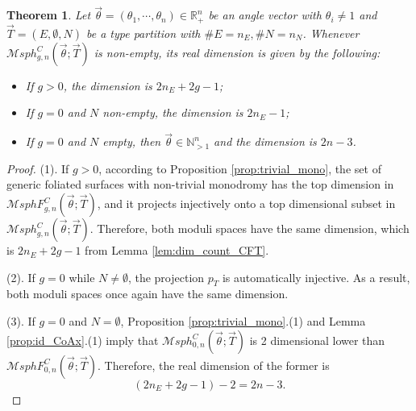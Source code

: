 \documentclass[pdflatex,sn-mathphys]{sn-jnl}%
\numberwithin{equation}{section}
\theoremstyle{thmstyleone}%
\newtheorem{theorem}{Theorem}[section]%
\newcommand{\RR}{\mathbb{R}}
\newcommand{\NN}{\mathbb{N}}%
\newcommand{\MsphCT}[4]{\mathcal{M}sph_{#1,#2}^C(#3;#4)}
\newcommand{\MsphCFT}[4]{\mathcal{M}sphF_{#1,#2}^C(#3;#4)}
\newcommand{\MsphgnCT}{\mathcal{M}sph_{g,n}^C(\vec{\theta};\vec{T})}
\newcommand{\MsphgnCFT}{\mathcal{M}sphF_{g,n}^C(\vec{\theta};\vec{T})}
\begin{document}
\begin{theorem}\label{thm:dim_count_CT}
    Let $\vec{\theta}=(\theta_1, \cdots, \theta_n) \in \RR^n_+$ be an angle vector with $\theta_i\neq1$ and $\vec{T}=( E,\emptyset, N )$ be a type partition with $ \#E=n_E, \#N=n_N $.
    Whenever $\MsphgnCT$ is non-empty, its real dimension is given by the following:
    \begin{itemize}
        \item If $g>0$, the dimension is $2n_E+2g-1$;
        \item If $g=0$ and $N$ non-empty, the dimension is $2n_E-1$;
        \item If $g=0$ and $N$ empty, then $\vec{\theta}\in\NN_{>1}^n$ and the dimension is $2n-3$.
    \end{itemize}
\end{theorem}
\begin{proof}
    (1). If $g>0$, according to Proposition \ref{prop:trivial_mono}, the set of generic foliated surfaces with non-trivial monodromy has the top dimension in $\MsphgnCFT$, and it projects injectively onto a top dimensional subset in $\MsphgnCT$.
    Therefore, both moduli spaces have the same dimension, which is $2n_E+2g-1$ from Lemma \ref{lem:dim_count_CFT}. %
    

    (2). If $g=0$ while $N\neq\emptyset$, the projection $p_T$ is automatically injective. As a result, both moduli spaces once again have the same dimension. %

    (3). If $g=0$ and $N=\emptyset$, Proposition \ref{prop:trivial_mono}.(1) and Lemma \ref{prop:id_CoAx}.(1) imply that $\MsphCT{0}{n}{\vec{\theta}}{\vec{T}}$ is 2 dimensional lower than $\MsphCFT{0}{n}{\vec{\theta}}{\vec{T}}$. Therefore, the real dimension of the former is
    \[ (2n_E + 2g -1) -2 = 2n-3.\]
\end{proof}
\end{document}
